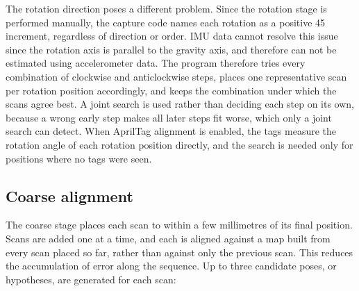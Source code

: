 The rotation direction poses a different problem. Since the rotation stage is performed manually, the capture code names each rotation as a positive 45 \textdegree increment, regardless of direction or order. IMU data cannot resolve this issue since the rotation axis is parallel to the gravity axis, and therefore can not be estimated using accelerometer data.
The program therefore tries every combination of clockwise and anticlockwise steps, places one representative scan per rotation position accordingly, and keeps the combination under which the scans agree best. A joint search is used rather than deciding each step on its own, because a wrong early step makes all later steps fit worse, which only a joint search can detect. When AprilTag alignment is enabled, the tags measure the rotation angle of each rotation position directly, and the search is needed only for positions where no tags were seen.

\subsection{Coarse alignment}
\label{sec:coarse}

The coarse stage places each scan to within a few millimetres of its final position. Scans are added one at a time, and each is aligned against a map built from every scan placed so far, rather than against only the previous scan. This reduces the accumulation of error along the sequence. Up to three candidate poses, or hypotheses, are generated for each scan:

